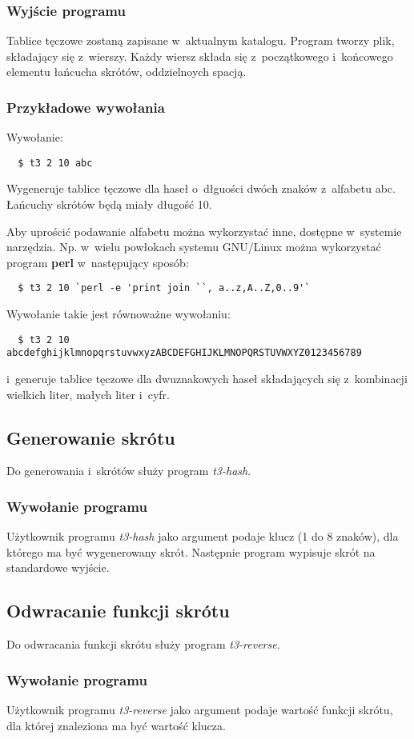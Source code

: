 \documentclass{article}
\begin{document}
\subsubsection{Wyjście programu}
Tablice tęczowe zostaną zapisane w~aktualnym katalogu.
Program tworzy plik, składający się z~wierszy. Każdy wiersz składa się z~początkowego i~końcowego elementu łańcucha skrótów, oddzielnoych spacją.

\subsubsection{Przykładowe wywołania}
Wywołanie:
\begin{lstlisting}
  $ t3 2 10 abc
\end{lstlisting}
Wygeneruje tablice tęczowe dla haseł o~dłguości dwóch znaków z~alfabetu abc. Łańcuchy skrótów będą miały długość 10.

Aby uprościć podawanie alfabetu można wykorzystać inne, dostępne w~systemie narzędzia. Np. w~wielu powłokach systemu GNU/Linux można wykorzystać program \textbf{perl} w~następujący sposób:
\begin{lstlisting}
  $ t3 2 10 `perl -e 'print join ``, a..z,A..Z,0..9'`
\end{lstlisting}
Wywołanie takie jest równoważne wywołaniu:
\begin{lstlisting}
  $ t3 2 10 abcdefghijklmnopqrstuvwxyzABCDEFGHIJKLMNOPQRSTUVWXYZ0123456789
\end{lstlisting}
i~generuje tablice tęczowe dla dwuznakowych haseł składających się z~kombinacji wielkich liter, małych liter i~cyfr.
\subsection{Generowanie skrótu}
Do generowania i~skrótów służy program \emph{t3-hash}.
\subsubsection{Wywołanie programu}
Użytkownik programu \emph{t3-hash} jako argument podaje klucz (1 do 8 znaków), dla którego ma być wygenerowany skrót.
Następnie program wypisuje skrót na standardowe wyjście.


\subsection{Odwracanie funkcji skrótu}
Do odwracania funkcji skrótu służy program \emph{t3-reverse}.
\subsubsection{Wywołanie programu}
Użytkownik programu \emph{t3-reverse} jako argument podaje wartość funkcji skrótu, dla której znaleziona ma być wartość klucza.
\end{document}
